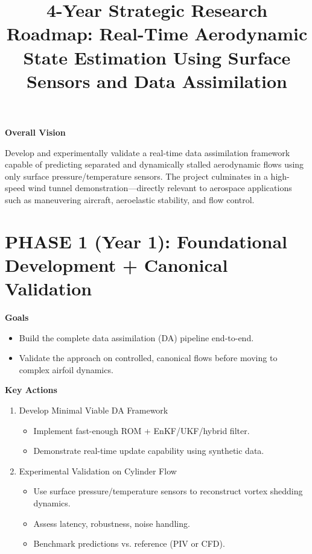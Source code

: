\documentclass[12pt,a4paper]{article}
\title{4-Year Strategic Research Roadmap: Real-Time Aerodynamic State Estimation Using Surface Sensors and Data Assimilation}
\author{}
\date{}
\begin{document}
\maketitle

\textbf{Overall Vision}

Develop and experimentally validate a real-time data assimilation framework capable of predicting separated and dynamically stalled aerodynamic flows using only surface pressure/temperature sensors.
The project culminates in a high-speed wind tunnel demonstration—directly relevant to aerospace applications such as maneuvering aircraft, aeroelastic stability, and flow control.

\section{PHASE 1 (Year 1): Foundational Development + Canonical Validation}

\textbf{Goals}

\begin{itemize}
    \item Build the complete data assimilation (DA) pipeline end-to-end.
    \item Validate the approach on controlled, canonical flows before moving to complex airfoil dynamics.
\end{itemize}

\textbf{Key Actions}

\begin{enumerate}
    \item Develop Minimal Viable DA Framework
    \begin{itemize}
        \item Implement fast-enough ROM + EnKF/UKF/hybrid filter.
        \item Demonstrate real-time update capability using synthetic data.
    \end{itemize}
    \item Experimental Validation on Cylinder Flow
    \begin{itemize}
        \item Use surface pressure/temperature sensors to reconstruct vortex shedding dynamics.
        \item Assess latency, robustness, noise handling.
        \item Benchmark predictions vs. reference (PIV or CFD).
    \end{itemize}
\end{enumerate}
\end{document}
